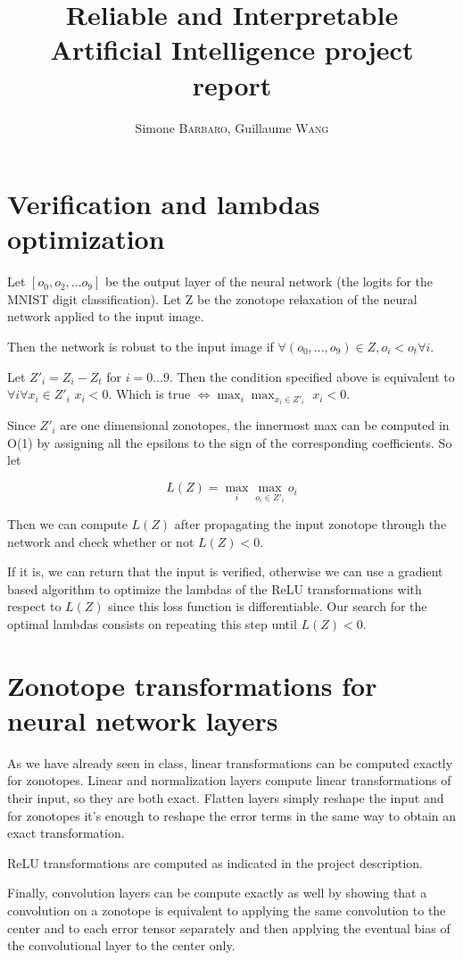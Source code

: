 \documentclass{article}
\title{Reliable and Interpretable Artificial Intelligence project report}
\author{Simone \textsc{Barbaro}, Guillaume \textsc{Wang}}
\date{}
\begin{document}
\maketitle

\section{Verification and lambdas optimization}

Let $[o_0, o_2, ... o_9]$ be the output layer of the neural network (the logits for the MNIST digit classification). Let Z be the zonotope relaxation of the neural network applied to the input image.

Then the network is robust to the input image if $\forall (o_0, ..., o_9) \in Z, o_i < o_t \forall i$.

Let $Z'_i = Z_i - Z_t$ for ${i = 0...9}$. Then the condition specified above is equivalent to $\forall i \forall x_i \in Z'_i$ $x_i < 0$. Which is true $\iff \max_i \max_{x_i \in Z'_i}$ $x_i < 0$.

Since $Z'_i$ are one dimensional zonotopes, the innermost max can be computed in O(1) by assigning all the epsilons to the sign of the corresponding coefficients. So let

\begin{equation*}
L(Z) = \max_i \max_{o_i \in Z'_i} o_i
\end{equation*}

Then we can compute $L(Z)$ after propagating the input zonotope through the network and check whether or not $L(Z) < 0$.

If it is, we can return that the input is verified, otherwise we can use a gradient based algorithm to optimize the lambdas of the ReLU transformations with respect to $L(Z)$ since this loss function is differentiable. Our search for the optimal lambdas consists on repeating this step until $L(Z) < 0$.


\section{Zonotope transformations for neural network layers}
As we have already seen in class, linear transformations can be computed exactly for zonotopes. Linear and normalization layers compute linear transformations of their input, so they are both exact. Flatten layers simply reshape the input and for zonotopes it's enough to reshape the error terms in the same way to obtain an exact transformation.

ReLU transformations are computed as indicated in the project description.

Finally, convolution layers can be compute exactly as well by showing that a convolution on a zonotope is equivalent to applying the same convolution to the center and to each error tensor separately and then applying the eventual bias of the convolutional layer to the center only.
\end{document}
